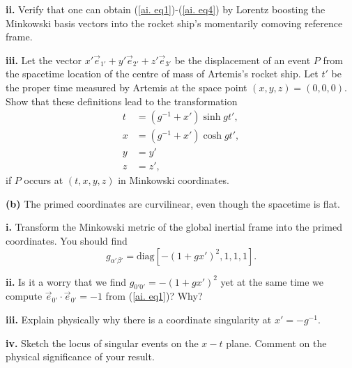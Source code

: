 \documentclass[a4paper]{article} %
\begin{document}
\begin{framed}
\textbf{ii.} 
Verify that one can obtain (\ref{ai. eq1})-(\ref{ai. eq4}) by Lorentz boosting the Minkowski basis vectors into the rocket ship’s momentarily comoving reference frame.
\end{framed}

\begin{framed}
\textbf{iii.} 
Let the vector $x'\vec{e}_{1'}+y'\vec{e}_{2'}+z'\vec{e}_{3'}$ be the displacement of an event $P$ from the spacetime location of the centre of mass of Artemis’s rocket ship. Let $t'$ be the proper time measured by Artemis at the space point $(x,y,z)=(0,0,0)$. Show that these definitions lead to the transformation
\begin{align}
t&=(g^{-1}+x')\sinh gt',\\
x&=(g^{-1}+x') \cosh gt',\\
y&=y'\\
z&=z',
\end{align}
if $P$ occurs at $(t,x,y,z)$ in Minkowski coordinates.
\end{framed}


\begin{framed}
\textbf{(b)} 
The primed coordinates are curvilinear, even though the spacetime is flat.
\end{framed}

\begin{framed}
\textbf{i.} Transform the Minkowski metric of the global inertial frame into the primed coordinates. You should find
\begin{equation}
g_{\alpha' \beta'}=\text{diag}[-(1+gx')^2,1,1,1].
\end{equation}
\end{framed}

\begin{framed}
\textbf{ii.} Is it a worry that we find $g_{0'0'}=-(1+gx')^2$ yet at the same time we compute $\vec{e}_{0'}\cdot\vec{e}_{0'}=-1$ from (\ref{ai. eq1})? Why?
\end{framed}

\begin{framed}
\textbf{iii.} Explain physically why there is a coordinate singularity at $x'=-g^{-1}$.
\end{framed}

\begin{framed}
\textbf{iv.} Sketch the locus of singular events on the $x-t$ plane. Comment on the physical significance of your result.
\end{framed}
\end{document}
